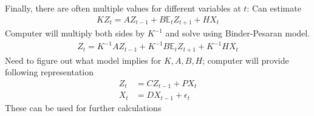 \documentclass{beamer}
\begin{document}
\begin{frame} 
Finally, there are often multiple values for different variables at $t$: Can estimate
  \begin{align}
    KZ_t=AZ_{t-1} + B\mathbb{E}_t Z_{t+1} + HX_t
  \end{align}
  \medskip
  Computer will multiply both sides by $K^{-1}$  and solve using Binder-Pesaran model. 
\begin{align}
  Z_t= K^{-1}AZ_{t-1} + K^{-1}B\mathbb{E}_t Z_{t+1} + K^{-1}HX_t
\end{align}
\medskip
 Need to figure out what model implies for $K,A,B,H$; computer will provide following representation
  \begin{align}
    Z_t &= CZ_{t-1} + PX_t\\
    X_t &=DX_{t-1} + \epsilon_t
  \end{align}
  \medskip
  These can be used for further calculations
\end{frame}


\end{document}
